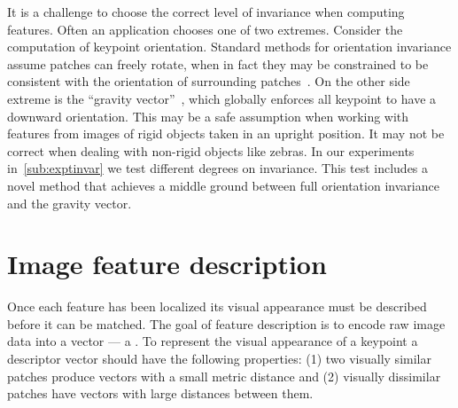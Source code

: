         It is a challenge to choose the correct level of invariance when computing features. Often an application
        chooses one of two extremes. Consider the computation of keypoint orientation. Standard methods for
        orientation invariance assume patches can freely rotate, when in fact they may be constrained to be
        consistent with the orientation of surrounding patches~\cite{lowe_distinctive_2004}. On the other side
        extreme is the ``gravity vector''~\cite{perdoch_efficient_2009}, which globally enforces all keypoint to
        have a downward orientation. This may be a safe assumption when working with features from images of rigid
        objects taken in an upright position. It may not be correct when dealing with non-rigid objects like
        zebras.
        In our experiments in~\cref{sub:exptinvar} we test different degrees on invariance. This test includes a
        novel method that achieves a middle ground between full orientation invariance and the gravity vector.


\section{Image feature description}\label{sec:featuredescribe}  

    Once each feature has been localized its visual appearance must be described before it can be matched. The goal
    of feature description is to encode raw image data into a vector --- \ie{} a . To
    represent the visual appearance of a keypoint a descriptor vector should have the following properties: (1) two
    visually similar patches produce vectors with a small metric distance and (2) visually dissimilar patches have
    vectors with large distances between them.

